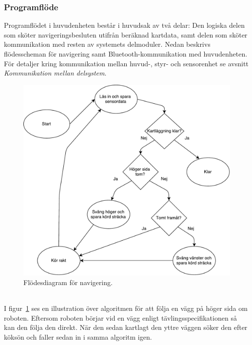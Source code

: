 \documentclass{article}
\begin{document}
\subsubsection{Programflöde}
Programflödet i huvudenheten består i huvudsak av två delar: Den logiska delen som sköter navigeringsbesluten utifrån beräknad kartdata, samt delen som sköter kommunikation med resten av systemets delmoduler. Nedan beskrivs flödesscheman för navigering samt Bluetooth-kommunikation med huvudenheten. För detaljer kring kommunikation mellan huvud-, styr- och sensorenhet se avsnitt \textit{Kommunikation mellan delsystem}. 
\begin{figure}[H]
\centering
\includegraphics[scale=0.6]{navigering_flowchart}
\caption{Flödesdiagram för navigering.}
\label{fig:navigering_flowchart}
\end{figure}
\ \\
I figur~\ref{fig:navigering_flowchart} ses en illustration över algoritmen för att följa en vägg på höger sida om roboten. Eftersom roboten börjar vid en vägg enligt tävlingsspecifikationen så kan den följa den direkt. När den sedan kartlagt den yttre väggen söker den efter köksön och faller sedan in i samma algoritm igen.
\end{document}
